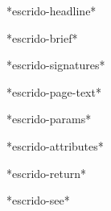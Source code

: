 *escrido-headline*

*escrido-brief*

*escrido-signatures*

*escrido-page-text*

*escrido-params*

*escrido-attributes*

*escrido-return*

*escrido-see*
